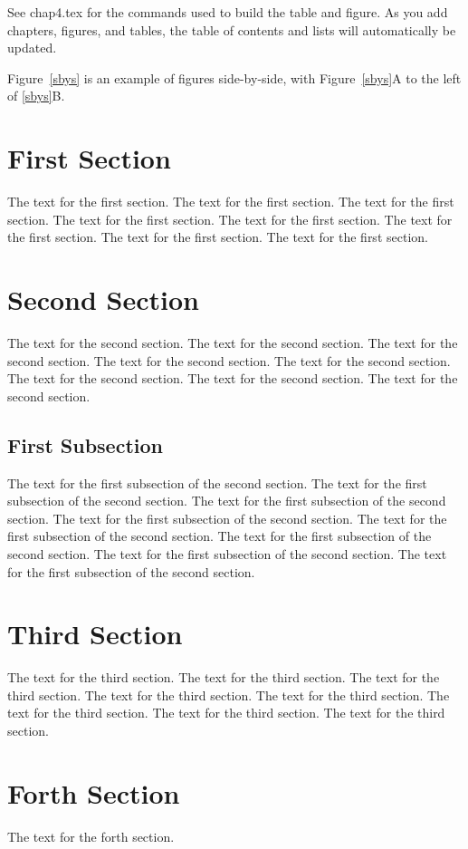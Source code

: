 See chap4.tex for the commands used to build the table and figure.  As
you add chapters, figures, and tables, the table of contents and lists
will automatically be updated.

Figure~\ref{sbys} is an example of figures side-by-side, with
Figure~\ref{sbys}A to the left of \ref{sbys}B.

\section{First Section}
The text for the first section.  The text for the first section.  The
text for the first section.  The text for the first section.  The text
for the first section.  The text for the first section.  The text for
the first section.  The text for the first section.

\section{Second Section}
The text for the second section.  The text for the second section.
The text for the second section.  The text for the second section.
The text for the second section.  The text for the second section.
The text for the second section.  The text for the second section.

\subsection{First Subsection}
The text for the first subsection of the second section.  The text for
the first subsection of the second section.  The text for the first
subsection of the second section.  The text for the first subsection
of the second section.  The text for the first subsection of the
second section.  The text for the first subsection of the second
section.  The text for the first subsection of the second section.
The text for the first subsection of the second section.

\section{Third Section}
The text for the third section.  The text for the third section.  The
text for the third section.  The text for the third section.  The text
for the third section.  The text for the third section.  The text for
the third section.  The text for the third section.

\section{Forth Section}
The text for the forth section.


